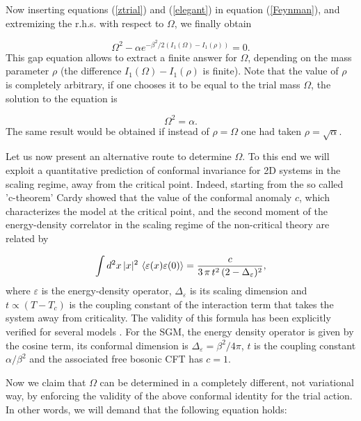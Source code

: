 \documentclass[a4paper,12pt]{article}
\begin{document}
\noindent Now inserting equations (\ref{ztrial}) and
(\ref{elegant}) in equation (\ref{Feynman}), and extremizing the
r.h.s. with respect to $\Omega$, we finally obtain

\begin{equation}\label{gapscha}
\Omega^2-\alpha e^{-\beta^2/2 (I_1(\Omega)-I_1(\rho))}=0.
\end{equation}
This gap equation allows to extract a finite answer for $\Omega$, depending on the
mass parameter $\rho$ (the difference $I_1(\Omega)-I_1(\rho)$ is finite). Note that
the value of $\rho$ is completely arbitrary, if one chooses it to be equal to the
trial mass $\Omega$, the solution to the equation is

\begin{equation}\label{SGGaussian}
\Omega^2=\alpha .
\end{equation}
The same result would be obtained if instead of $\rho=\Omega$ one had taken
$\rho=\sqrt{\alpha}$.

\vspace{.5cm}

Let us now present an alternative route to determine $\Omega$. To this end we will
exploit a quantitative prediction of conformal invariance for 2D systems in the
scaling regime, away from the critical point. Indeed, starting from the so called
'c-theorem' \cite{Zamolodchikov} Cardy \cite{Cardy} showed that the value of the
conformal anomaly $c$, which characterizes the model at the critical point, and the
second moment of the energy-density correlator in the scaling regime of the
non-critical theory are related by

\begin{equation} \label{Cardy}
\int d^2x\, |x|^2\, \left\langle\varepsilon(x)\varepsilon(0)\right\rangle = \frac{c}{3\, \pi
\,t^2\,(2 - \Delta_\varepsilon)^2},
\end{equation}
where $\varepsilon$ is the energy-density operator, $\Delta_\varepsilon$ is its
scaling dimension and $t\propto(T-T_c)$ is the coupling constant of the interaction
term that takes the system away from criticality. The validity of this formula has
been explicitly verified for several models \cite{Cardy} \cite{Cardy2} \cite{Naon}
\cite{Salvay}. For the SGM, the energy density operator is given by the cosine term,
its conformal dimension is $\Delta_\varepsilon=\beta^2/4\pi$, $t$ is the coupling
constant $\alpha/\beta^2$ and the associated free bosonic CFT has $c=1$.

Now we claim that $\Omega$ can be determined in a completely different, not
variational way, by enforcing the validity of the above conformal identity for the
trial action. In other words, we will demand that the following equation holds:
\end{document}

